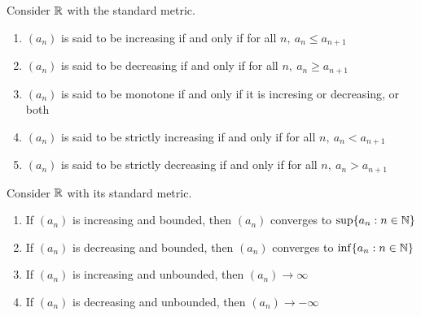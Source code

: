 \begin{definition}
    Consider $\mathbb{R}$ with the standard metric.
    \begin{enumerate}[($i$)]
        \item $(a_n)$ is said to be increasing if and only if for all $n, ~a_n \leq a_{n+1}$
        \item $(a_n)$ is said to be decreasing if and only if for all $n, ~a_n \geq a_{n+1}$
        \item $(a_n)$ is said to be monotone if and only if it is incresing or decreasing, or both
        \item $(a_n)$ is said to be strictly increasing if and only if for all $n, ~a_n < a_{n+1}$
        \item $(a_n)$ is said to be strictly decreasing if and only if for all $n, ~a_n > a_{n+1}$
    \end{enumerate}
\end{definition}

\begin{theorem}
    \label{MCT}
    Consider $\mathbb{R}$ with its standard metric.
    \begin{enumerate}[($i$)]
        \item If $(a_n)$ is increasing and bounded, then $(a_n)$ converges to $\sup\{a_n : n \in \mathbb{N}\}$
        \item If $(a_n)$ is decreasing and bounded, then $(a_n)$ converges to $\inf\{a_n : n \in \mathbb{N}\}$
        \item If $(a_n)$ is increasing and unbounded, then $(a_n) \to \infty$
        \item If $(a_n)$ is decreasing and unbounded, then $(a_n) \to -\infty$
    \end{enumerate}
\end{theorem}


